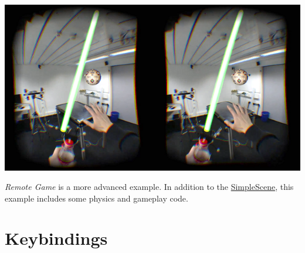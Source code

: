 \includegraphics*[width=\textwidth]{RemoteGameThumb.png}

\emph{Remote Game} is a more advanced example. In addition to the \hyperref[simple_scene]{SimpleScene}, this example includes some physics and gameplay code.

\section{Keybindings}\label{keybindings}

